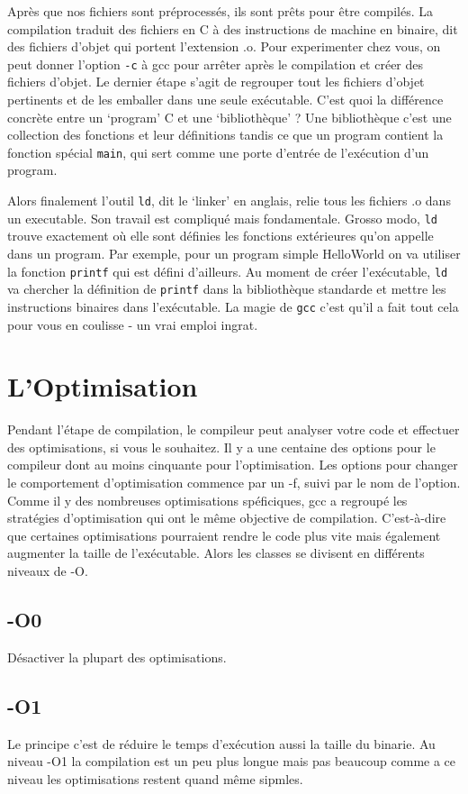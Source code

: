 \documentclass[11pt]{article} %
\begin{document}
Après que nos fichiers sont préprocessés, ils sont prêts pour être compilés. La compilation traduit des fichiers en C à des instructions de machine
en binaire, dit des fichiers d'objet qui portent l'extension .o. Pour experimenter chez vous, on peut donner l'option \verb|-c| à gcc pour arrêter après
le compilation et créer des fichiers d'objet.
    Le dernier étape s'agit de regrouper tout les fichiers d'objet pertinents et de les emballer dans une seule exécutable. C'est quoi la différence concrète entre
un `program' C et une `bibliothèque' ? Une bibliothèque c'est une collection des fonctions et leur définitions tandis ce que un program contient la fonction spécial
\verb|main|, qui sert comme une porte d'entrée de l'exécution d'un program.

    Alors finalement l'outil \verb|ld|, dit le `linker' en anglais, relie tous les fichiers .o dans un executable. Son travail est compliqué mais fondamentale. Grosso modo, \verb|ld|
trouve exactement où elle sont définies les fonctions extérieures qu'on appelle dans un program. Par exemple, pour un program simple HelloWorld on va utiliser la fonction \verb|printf| qui
est défini d'ailleurs. Au moment de créer l'exécutable, \verb|ld| va chercher la définition de \verb|printf| dans la bibliothèque standarde et mettre les instructions binaires dans l'exécutable.
La magie de \verb|gcc| c'est qu'il a fait tout cela pour vous en coulisse - un vrai emploi ingrat.
\section*{L'Optimisation}
Pendant l'étape de compilation, le compileur peut analyser votre code et effectuer des optimisations, si vous le souhaitez.
Il y a une centaine des options pour le compileur dont au moins cinquante pour l'optimisation. Les options pour changer le comportement
d'optimisation commence par un -f, suivi par le nom de l'option. Comme il y des nombreuses optimisations spéficiques, gcc a regroupé les
stratégies d'optimisation qui ont le même objective de compilation. C'est-à-dire que certaines optimisations pourraient rendre le code plus vite mais
également augmenter la taille de l'exécutable. Alors les classes se divisent en différents niveaux de -O.
\subsection*{-O0}
Désactiver la plupart des optimisations.

\subsection*{-O1}
Le principe c'est de réduire le temps d'exécution aussi la taille du binarie. Au niveau -O1 la compilation est un peu plus longue mais pas beaucoup
comme a ce niveau les optimisations restent quand même sipmles.
\end{document}
